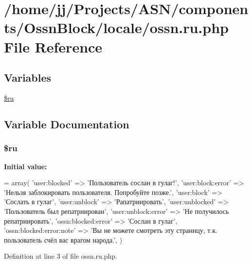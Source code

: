 \hypertarget{components_2_ossn_block_2locale_2ossn_8ru_8php}{}\section{/home/jj/\+Projects/\+A\+S\+N/components/\+Ossn\+Block/locale/ossn.ru.\+php File Reference}
\label{components_2_ossn_block_2locale_2ossn_8ru_8php}
\subsection*{Variables}
\begin{DoxyCompactItemize}
\item 
\hyperlink{components_2_ossn_block_2locale_2ossn_8ru_8php_aab84a3feda2b0e489cac7cd194e8d726}{\$ru}
\end{DoxyCompactItemize}


\subsection{Variable Documentation}
\subsubsection[{\texorpdfstring{\$ru}{$ru}}]{\setlength{\rightskip}{0pt plus 5cm}\$ru}\hypertarget{components_2_ossn_block_2locale_2ossn_8ru_8php_aab84a3feda2b0e489cac7cd194e8d726}{}\label{components_2_ossn_block_2locale_2ossn_8ru_8php_aab84a3feda2b0e489cac7cd194e8d726}
{\bfseries Initial value\+:}
\begin{DoxyCode}
= array(
    \textcolor{stringliteral}{'user:blocked'} => \textcolor{stringliteral}{'Пользователь сослан в гулаг!'},
    \textcolor{stringliteral}{'user:block:error'} => \textcolor{stringliteral}{'Нельзя заблокировать пользователя. Попробуйте позже.'},
    \textcolor{stringliteral}{'user:block'} => \textcolor{stringliteral}{'Сослать в гулаг'},
    \textcolor{stringliteral}{'user:unblock'} => \textcolor{stringliteral}{'Рапатриировать'},
    \textcolor{stringliteral}{'user:unblocked'} => \textcolor{stringliteral}{'Пользователь был репатриирован'},
    \textcolor{stringliteral}{'user:unblock:error'} => \textcolor{stringliteral}{'Не получилось репатриировать'},
    \textcolor{stringliteral}{'ossn:blocked:error'} => \textcolor{stringliteral}{'Сослан в гулаг'},
    \textcolor{stringliteral}{'ossn:blocked:error:note'} => \textcolor{stringliteral}{'Вы не можете смотреть эту страницу, т.к. пользователь счёл вас врагом
       народа.'},
)
\end{DoxyCode}


Definition at line 3 of file ossn.\+ru.\+php.

